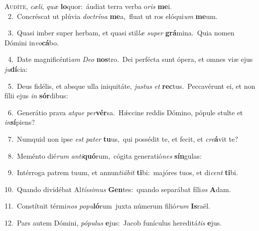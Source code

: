 \lettrine{\initial\textcolor{\initialcolor}{A}}{udíte,} \textit{cæ}\-\textit{li}, \textit{quæ} \textbf{lo}\-quor:~\star áudiat terra verba o\textit{ris} \textbf{me}\-i.\\
{\numbfont\textcolor{\numbcolor}{~2.}}~Concréscat ut plúvia \textit{doc}\-\textit{trí}\textit{na} \textbf{me}\-a,~\star fluat ut ros elóqui\textit{um} \textbf{me}\-um.\par
{\numbfont\textcolor{\numbcolor}{~3.}}~Quasi imber super herbam, et quasi stil\textit{læ} \textit{su}\-\textit{per} \textbf{grá}\-mina.~\star Quia nomen Dómini in\-\textit{vo}\-\textbf{cá}bo.\par
{\numbfont\textcolor{\numbcolor}{~4.}}~Date magnificénti\textit{am} \textit{De}\-\textit{o} \textbf{nos}\-tro.~\star Dei perfécta sunt ópera, et omnes viæ ejus \textit{ju}\-\textbf{dí}cia:\par
{\numbfont\textcolor{\numbcolor}{~5.}}~Deus fidélis, et absque ulla iniquitáte, \textit{jus}\-\textit{tus} \textit{et} \textbf{rec}\-tus.~\star Peccavérunt ei, et non fílii ejus \textit{in} \textbf{sór}\-dibus:\par
{\numbfont\textcolor{\numbcolor}{~6.}}~Generátio prava \textit{at}\-\textit{que} \textit{per}\-\textbf{vér}sa.~\star Hǽccine reddis Dómino, pópule stulte et \textit{in}\-\textbf{sí}piens?\par
{\numbfont\textcolor{\numbcolor}{~7.}}~Numquid non ipse \textit{est} \textit{pa}\-\textit{ter} \textbf{tu}\-us,~\star qui possédit te, et fecit, et \textit{cre}\-\textbf{á}vit te?\par
{\numbfont\textcolor{\numbcolor}{~8.}}~Meménto dié\textit{rum} \textit{an}\-\textit{ti}\textbf{quó}rum,~\star cógita generatió\textit{nes} \textbf{sín}\-gulas:\par
{\numbfont\textcolor{\numbcolor}{~9.}}~Intérroga patrem tuum, et annun\-\textit{ti}\-\textit{á}\textit{bit} \textbf{ti}\-bi:~\star majóres tuos, et di\textit{cent} \textbf{ti}\-bi.\par
{\numbfont\textcolor{\numbcolor}{10.}}~Quando dividébat Al\-\textit{tís}\-\textit{si}\textit{mus} \textbf{Gen}\-tes:~\star quando separábat fíli\textit{os} \textbf{A}\-dam.\par
{\numbfont\textcolor{\numbcolor}{11.}}~Constítuit térmi\textit{nos} \textit{po}\-\textit{pu}\textbf{ló}rum~\star juxta númerum filió\textit{rum} \textbf{Is}\-raël.\par
{\numbfont\textcolor{\numbcolor}{12.}}~Pars autem Dómini, \textit{pó}\-\textit{pu}\textit{lus} \textbf{e}\-jus:~\star Jacob funículus hereditá\textit{tis} \textbf{e}\-jus.\par
